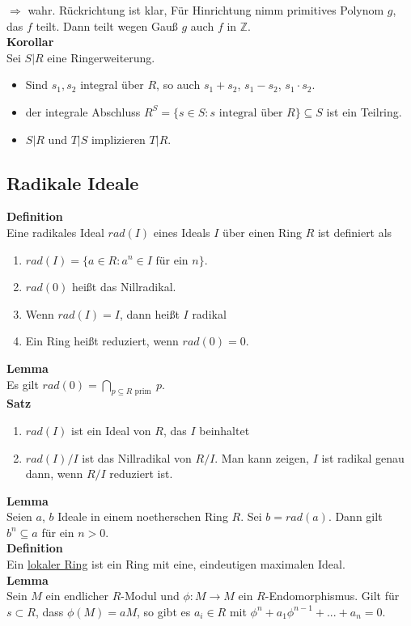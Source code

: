 \documentclass[a4paper, 12pt]{article}
\begin{document}
$\Rightarrow$ wahr. Rückrichtung ist klar, Für Hinrichtung nimm primitives Polynom $g$, das $f$ teilt. Dann teilt wegen Gauß $g$ auch $f$ in $\mathbb{Z}$.\\
\textbf{Korollar}\\
Sei $S|R$ eine Ringerweiterung. \begin{itemize}
	\item Sind $s_1, s_2$ integral über $R$, so auch $s_1+s_2$, $s_1-s_2$, $s_1\cdot s_2$.
	\item der integrale Abschluss $R^S = \{s \in S: s \text{ integral über } R\} \subseteq S$ ist ein Teilring.
	\item $S|R$ und $T|S$ implizieren $T|R$.
\end{itemize}
\subsection{Radikale Ideale}
\textbf{Definition}\\
Eine radikales Ideal $rad(I)$ eines Ideals $I$ über einen Ring $R$ ist definiert als \begin{enumerate}
	\item $rad(I) = \{a \in R: a^n \in I \text{ für ein $n$}\}$.
	\item $rad(0)$ heißt das Nillradikal.
	\item Wenn $rad(I) = I$, dann heißt $I$ radikal
	\item Ein Ring heißt reduziert, wenn $rad(0) = 0$.
\end{enumerate}
\textbf{Lemma}\\
Es gilt $rad(0) = \bigcap_{p \subseteq R \text{ prim }} p$.\\
\textbf{Satz} \begin{enumerate}
	\item $rad(I)$ ist ein Ideal von $R$, das $I$ beinhaltet
	\item $rad(I)/I$ ist das Nillradikal von $R/I$. Man kann zeigen, $I$ ist radikal genau dann, wenn $R/I$ reduziert ist. 
\end{enumerate}
\textbf{Lemma}\\
Seien $a$, $b$ Ideale in einem noetherschen Ring $R$. Sei $b = rad(a)$. Dann gilt $b^n \subseteq a$ für ein $n > 0$.\\
\textbf{Definition}\\
Ein \underline{lokaler Ring} ist ein Ring mit eine, eindeutigen maximalen Ideal.\\
\textbf{Lemma}\\
Sein $M$ ein endlicher $R$-Modul und $\phi: M \to M$ ein $R$-Endomorphismus. Gilt für $s \subset R$, dass $\phi(M) = aM$, so gibt es $a_i \in R$ mit $\phi^n + a_1\phi^{n-1} + ... + a_n = 0$.\\
\end{document}

